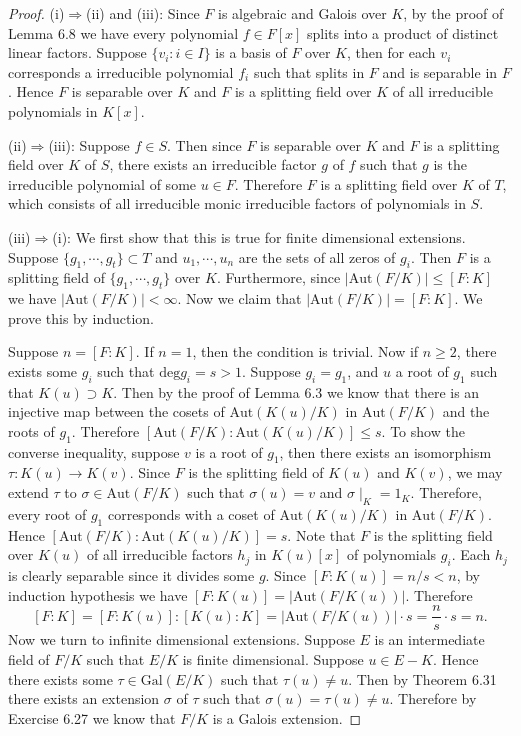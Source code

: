 \begin{proof}
(i)$\Rightarrow$(ii) and (iii): Since $F$ is algebraic and Galois over $K$, by the proof of Lemma 6.8 we have every polynomial $f\in F[x]$ splits into a product of distinct linear factors. Suppose $\{v_i:i\in I\}$ is a basis of $F$ over $K$, then for each $v_i$ corresponds a irreducible polynomial $f_i$ such that splits in $F$ and is separable in $F$. Hence $F$ is separable over $K$ and $F$ is a splitting field over $K$ of all irreducible polynomials in $K[x]$.\par
(ii)$\Rightarrow$(iii): Suppose $f\in S$. Then since $F$ is separable over $K$ and $F$ is a splitting field over $K$ of $S$, there exists an irreducible factor $g$ of $f$ such that $g$ is the irreducible polynomial of some $u\in F$. Therefore $F$ is a splitting field over $K$ of $T$, which consists of all irreducible monic irreducible factors of polynomials in $S$.\par
(iii)$\Rightarrow$(i): We first show that this is true for finite dimensional extensions. Suppose $\{g_1,\cdots,g_t\}\subset T$ and $u_1,\cdots,u_n$ are the sets of all zeros of $g_i$. Then $F$ is a splitting field of $\{g_1,\cdots,g_t\}$ over $K$. Furthermore, since $|\mathrm{Aut}(F/K)|\le [F:K]$ we have $|\mathrm{Aut}(F/K)|<\infty$. Now we claim that $|\mathrm{Aut}(F/K)|=[F:K]$. We prove this by induction.\par
Suppose $n=[F:K]$. If $n=1$, then the condition is trivial. Now if $n\ge 2$, there exists some $g_i$ such that $\mathrm{deg}g_i=s>1$. Suppose $g_i=g_1$, and $u$ a root of $g_1$ such that $K(u)\supset K$. Then by the proof of Lemma 6.3 we know that there is an injective map between the cosets of $\mathrm{Aut}(K(u)/K)$ in $\mathrm{Aut}(F/K)$ and the roots of $g_1$. Therefore $[\mathrm{Aut}(F/K):\mathrm{Aut}(K(u)/K)]\le s$. To show the converse inequality, suppose $v$ is a root of $g_1$, then there exists an isomorphism $\tau:K(u)\to K(v)$. Since $F$ is the splitting field of $K(u)$ and $K(v)$, we may extend $\tau$ to $\sigma\in\mathrm{Aut}(F/K)$ such that $\sigma(u)=v$ and $\sigma\mid_K=1_K$. Therefore, every root of $g_1$ corresponds with a coset of $\mathrm{Aut}(K(u)/K)$ in $\mathrm{Aut}(F/K)$. Hence $[\mathrm{Aut}(F/K):\mathrm{Aut}(K(u)/K)]=s$. Note that $F$ is the splitting field over $K(u)$ of all irreducible factors $h_j$ in $K(u)[x]$ of polynomials $g_i$. Each $h_j$ is clearly separable since it divides some $g$. Since $[F:K(u)]=n/s<n$, by induction hypothesis we have $[F:K(u)]=|\mathrm{Aut}(F/K(u))|$. Therefore 
$$
\left[ F:K \right] =\left[ F:K\left( u \right) \right] :\left[ K\left( u \right) :K \right] =\left| \mathrm{Aut}\left( F/K\left( u \right) \right) \right|\cdot s=\frac{n}{s}\cdot s=n.
$$
Now we turn to infinite dimensional extensions. Suppose $E$ is an intermediate field of $F/K$ such that $E/K$ is finite dimensional. Suppose $u\in E-K$. Hence there exists some $\tau\in\mathrm{Gal}(E/K)$ such that $\tau(u)\ne u$. Then by Theorem 6.31 there exists an extension $\sigma$ of $\tau$ such that $\sigma(u)=\tau(u)\ne u$. Therefore by Exercise 6.27 we know that $F/K$ is a Galois extension.
\end{proof}
